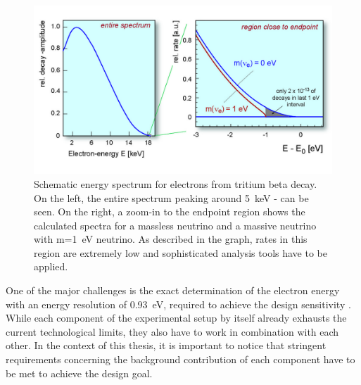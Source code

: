       \begin{figure}
	\centering
      	\includegraphics[width = 0.9 \textwidth]{graphics/katrinExperiment/electronSpectrum.jpg}
      	\caption[Schematic Tritium Energy Spectrum]{Schematic energy spectrum for electrons from tritium beta decay. On the left, the entire spectrum peaking around \SI{5}{\kilo\electronvolt} - can be seen. On the right, a zoom-in to the endpoint region shows the calculated spectra for a massless neutrino and a massive neutrino with m=\SI{1}{\electronvolt} neutrino. As described in the graph, rates in this region are extremely low and sophisticated analysis tools have to be applied.}
      	\label{fig:katrinExperiment:tritiumSpectrum}
      \end{figure}
      One of the major challenges is the exact determination of the electron energy with an energy resolution of \SI{0.93}{\electronvolt}, required to achieve the design sensitivity \cite{KATRINWolf}. While each component of the experimental setup by itself already exhausts the current technological limits, they also have to work in combination with each other. In the context of this thesis, it is important to notice that stringent requirements concerning the background contribution of each component have to be met to achieve the design goal.
